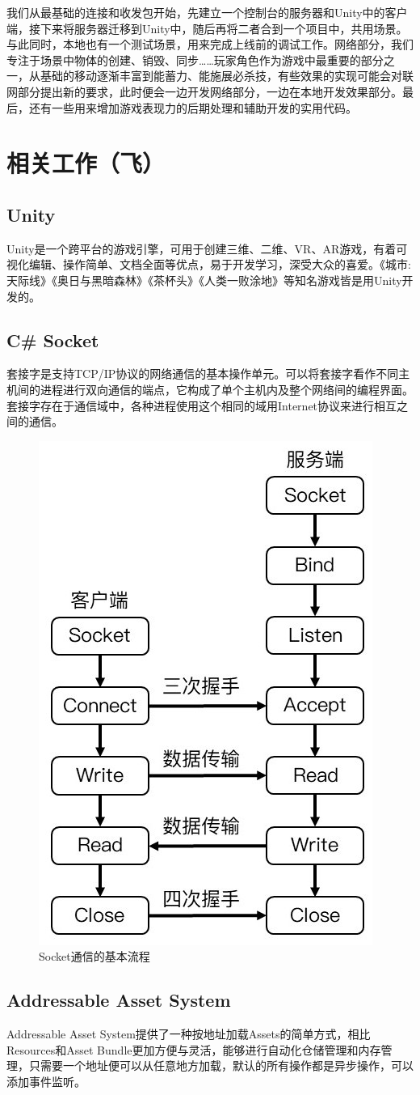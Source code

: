 \documentclass[conference]{IEEEtran}
\begin{document}
我们从最基础的连接和收发包开始，先建立一个控制台的服务器和Unity中的客户端，接下来将服务器迁移到Unity中，随后再将二者合到一个项目中，共用场景。与此同时，本地也有一个测试场景，用来完成上线前的调试工作。网络部分，我们专注于场景中物体的创建、销毁、同步……玩家角色作为游戏中最重要的部分之一，从基础的移动逐渐丰富到能蓄力、能施展必杀技，有些效果的实现可能会对联网部分提出新的要求，此时便会一边开发网络部分，一边在本地开发效果部分。最后，还有一些用来增加游戏表现力的后期处理和辅助开发的实用代码。


\section{相关工作（飞）}
\subsection{Unity}
Unity是一个跨平台的游戏引擎，可用于创建三维、二维、VR、AR游戏，有着可视化编辑、操作简单、文档全面等优点，易于开发学习，深受大众的喜爱。《城市:天际线》《奥日与黑暗森林》《茶杯头》《人类一败涂地》等知名游戏皆是用Unity开发的。

\subsection{C\# Socket}
套接字是支持TCP/IP协议的网络通信的基本操作单元。可以将套接字看作不同主机间的进程进行双向通信的端点，它构成了单个主机内及整个网络间的编程界面。套接字存在于通信域中，各种进程使用这个相同的域用Internet协议来进行相互之间的通信。\cite{Unity3D网络游戏实战}

\begin{figure}[htbp]
    \centerline{\includegraphics[width=.22\textwidth]{images/Socket通信的基本流程.jpg}}
    \caption{Socket通信的基本流程}
    \label{fig:figure1}
\end{figure}


\subsection{Addressable Asset System}
Addressable Asset System提供了一种按地址加载Assets的简单方式，相比Resources和Asset Bundle更加方便与灵活，能够进行自动化仓储管理和内存管理，只需要一个地址便可以从任意地方加载，默认的所有操作都是异步操作，可以添加事件监听。
\end{document}
